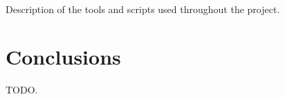 \documentclass[a4paper,10pt]{article}
\begin{document}
\begin{multicols}{2}
Description of the tools and scripts used throughout the project.



\section{Conclusions}

TODO.







\end{multicols}
\end{document}
